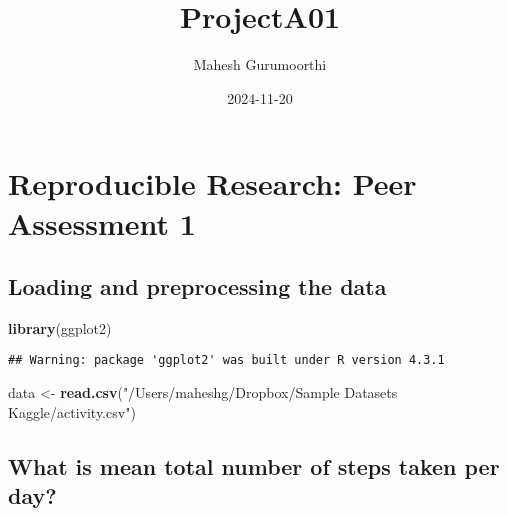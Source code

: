 \documentclass[
]{article}
\title{ProjectA01}
\author{Mahesh Gurumoorthi}
\date{2024-11-20}
\newenvironment{Shaded}{\begin{snugshade}}{\end{snugshade}}
\newcommand{\AttributeTok}[1]{\textcolor[rgb]{0.13,0.29,0.53}{#1}}
\newcommand{\ConstantTok}[1]{\textcolor[rgb]{0.56,0.35,0.01}{#1}}
\newcommand{\DecValTok}[1]{\textcolor[rgb]{0.00,0.00,0.81}{#1}}
\newcommand{\FunctionTok}[1]{\textcolor[rgb]{0.13,0.29,0.53}{\textbf{#1}}}
\newcommand{\NormalTok}[1]{#1}
\newcommand{\OtherTok}[1]{\textcolor[rgb]{0.56,0.35,0.01}{#1}}
\newcommand{\SpecialCharTok}[1]{\textcolor[rgb]{0.81,0.36,0.00}{\textbf{#1}}}
\newcommand{\StringTok}[1]{\textcolor[rgb]{0.31,0.60,0.02}{#1}}
\begin{document}
\maketitle

\section{Reproducible Research: Peer Assessment
1}\label{reproducible-research-peer-assessment-1}

\subsection{Loading and preprocessing the
data}\label{loading-and-preprocessing-the-data}

\begin{Shaded}
\begin{Highlighting}[]
\FunctionTok{library}\NormalTok{(ggplot2)}
\end{Highlighting}
\end{Shaded}

\begin{verbatim}
## Warning: package 'ggplot2' was built under R version 4.3.1
\end{verbatim}

\begin{Shaded}
\begin{Highlighting}[]
\NormalTok{data }\OtherTok{\textless{}{-}} \FunctionTok{read.csv}\NormalTok{(}\StringTok{"/Users/maheshg/Dropbox/Sample Datasets Kaggle/activity.csv"}\NormalTok{)}
\end{Highlighting}
\end{Shaded}

\subsection{What is mean total number of steps taken per
day?}\label{what-is-mean-total-number-of-steps-taken-per-day}

\begin{Shaded}
\end{Shaded}
\end{document}
